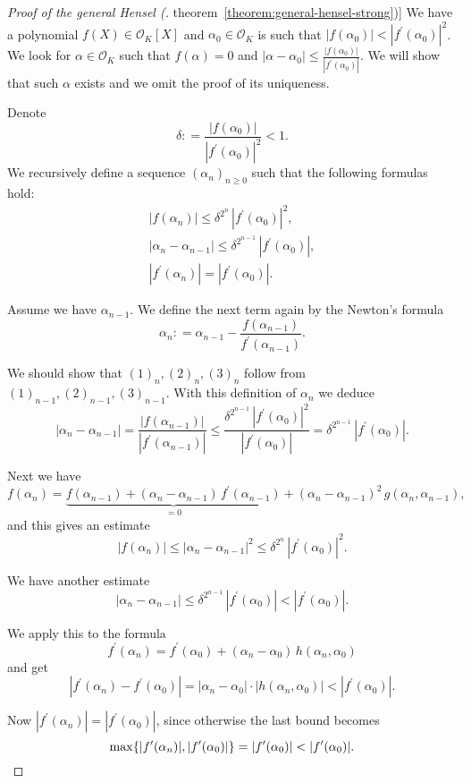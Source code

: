 \documentclass{article}
\newcommand{\dfn}{\mathrel{\mathop:}=}
\renewcommand{\O}{\mathcal{O}}
\newcommand{\refref}[2]{\hyperref[#2]{#1~\ref*{#2}}}
\theoremstyle{myplain}
\theoremstyle{mydefinition}
\begin{document}
\begin{proof}[Proof of the general Hensel (\refref{theorem}{theorem:general-hensel-strong})]
  We have a polynomial $f (X) \in \O_K [X]$ and $\alpha_0 \in \O_K$ is such that
  $|f (\alpha_0)| < |f^\prime (\alpha_0)|^2$. We look for $\alpha \in \O_K$ such
  that $f (\alpha) = 0$ and
  $|\alpha - \alpha_0| \le \frac{|f(\alpha_0)|}{|f^\prime (\alpha_0)|}$. We will
  show that such $\alpha$ exists and we omit the proof of its uniqueness.

  Denote
  $$\delta \dfn \frac{|f (\alpha_0)|}{|f^\prime (\alpha_0)|^2} < 1.$$
  We recursively define a sequence $(\alpha_n)_{n \ge 0}$ such that the
  following formulas hold:
  \begin{gather*}
    \tag*{$(1)_n$} |f (\alpha_n)| \le \delta^{2^n} \, |f^\prime (\alpha_0)|^2,\\
    \tag*{$(2)_n$} |\alpha_n - \alpha_{n-1}| \le \delta^{2^{n-1}} \, |f^\prime (\alpha_0)|,\\
    \tag*{$(3)_n$} |f^\prime (\alpha_n)| = |f^\prime (\alpha_0)|.
  \end{gather*}

  Assume we have $\alpha_{n-1}$. We define the next term again by the Newton's
  formula
  $$\alpha_n \dfn \alpha_{n-1} - \frac{f (\alpha_{n-1})}{f^\prime (\alpha_{n-1})}.$$

  We should show that $(1)_n,(2)_n,(3)_n$ follow from
  $(1)_{n-1},(2)_{n-1},(3)_{n-1}$. With this definition of $\alpha_n$ we deduce
  \[ |\alpha_n - \alpha_{n-1}| =
    \frac{|f (\alpha_{n-1})|}{|f^\prime (\alpha_{n-1})|} \le
    \frac{\delta^{2^{n-1}}\,|f^\prime (\alpha_0)|^2}{|f^\prime (\alpha_0)|} =
    \delta^{2^{n-1}} \, |f^\prime (\alpha_0)|. \]

  Next we have
  \[ f (\alpha_n) = \underbrace{f (\alpha_{n-1}) + (\alpha_n - \alpha_{n-1}) \, f^\prime (\alpha_{n-1})}_{=0} +
    (\alpha_n - \alpha_{n-1})^2 \, g (\alpha_n,\alpha_{n-1}), \]
  and this gives an estimate
  $$|f (\alpha_n)| \le |\alpha_n - \alpha_{n-1}|^2 \le \delta^{2^n} \, |f^\prime (\alpha_0)|^2.$$

  We have another estimate
  $$|\alpha_n - \alpha_{n-1}| \le \delta^{2^{n-1}}\,|f^\prime (\alpha_0)| < |f^\prime (\alpha_0)|.$$

  We apply this to the formula
  $$f^\prime (\alpha_n) = f^\prime (\alpha_0) + (\alpha_n - \alpha_0) \, h (\alpha_n,\alpha_0)$$
  and get
  $$|f^\prime (\alpha_n) - f^\prime (\alpha_0)| =
  |\alpha_n - \alpha_0| \cdot |h (\alpha_n,\alpha_0)| < |f^\prime (\alpha_0)|.$$

  Now $|f^\prime (\alpha_n)| = |f^\prime (\alpha_0)|$, since otherwise the last
  bound becomes
  \[ \max \{ |f^\prime (\alpha_n)|, |f^\prime (\alpha_0)| \} =
    |f^\prime (\alpha_0)| < |f^\prime (\alpha_0)|. \qedhere \]
\end{proof}
\end{document}
